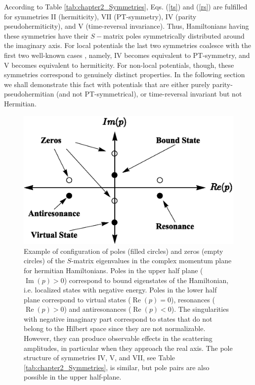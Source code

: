 According to Table \ref{tab:chapter2_Symmetries},  Eqs. (\ref{ts}) and (\ref{rs}) are fulfilled
for symmetries  II (hermiticity), VII (PT-symmetry), IV (parity pseudohermiticity),
and V (time-reversal invariance). Thus, Hamiltonians having these symmetries have their $S-$matrix poles symmetrically distributed around the imaginary axis. For local potentials the last two symmetries coalesce with the first two well-known
cases \cite{Ruschhaupt2017}, namely,
IV becomes equivalent to PT-symmetry, and V becomes equivalent to hermiticity. For non-local potentials, though, these symmetries
correspond to genuinely distinct properties. In the following section we shall demonstrate this fact with potentials that are
either purely parity-pseudohermitian (and not PT-symmetrical), or time-reversal invariant but not Hermitian.
%


\begin{figure}[h]
  \centering
  \includegraphics[width=0.5\linewidth]{Figures/DiagramPoles.eps}
  \caption{Example of configuration of poles (filled circles) and zeros (empty circles) of the $S$-matrix eigenvalues in the complex momentum plane for hermitian Hamiltonians.  Poles in the upper half plane ($\operatorname{Im}(p) > 0$) correspond to bound eigenstates of the Hamiltonian, i.e. localized states with negative energy. Poles in the lower half plane correspond to  virtual states ($\operatorname{Re}(p) = 0$), resonances ($\operatorname{Re}(p) > 0$) and antiresonances ($\operatorname{Re}(p)<0$). The singularities with negative imaginary part correspond to states that do not belong to the Hilbert space since they are not normalizable. However, they can produce observable effects in the scattering amplitudes, in particular when they approach the real axis. The pole structure of symmetries IV, V, and VII, see Table \ref{tab:chapter2_Symmetries},
  is similar, but pole pairs are also possible in the upper half-plane.}
  \label{fig:DiagramPoles}
\end{figure}

